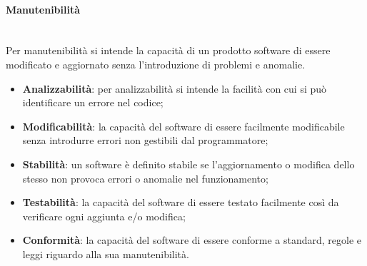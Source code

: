 	\paragraph{Manutenibilità} \mbox{}\\
	Per manutenibilità si intende la capacità di un prodotto software di essere modificato e aggiornato senza l'introduzione di problemi e anomalie.
	\begin{itemize}
		\item \textbf{Analizzabilità}: per analizzabilità si intende la facilità con cui si può identificare un errore nel codice;
		\item \textbf{Modificabilità}: la capacità del software di essere facilmente modificabile senza introdurre errori non gestibili dal programmatore;
		\item \textbf{Stabilità}: un software è definito stabile se l'aggiornamento o modifica dello stesso non provoca errori o anomalie nel funzionamento;
		\item \textbf{Testabilità}: la capacità del software di essere testato facilmente così da verificare ogni aggiunta e/o modifica;
		\item \textbf{Conformità}: la capacità del software di essere conforme a standard, regole e leggi riguardo alla sua manutenibilità.
	\end{itemize}
